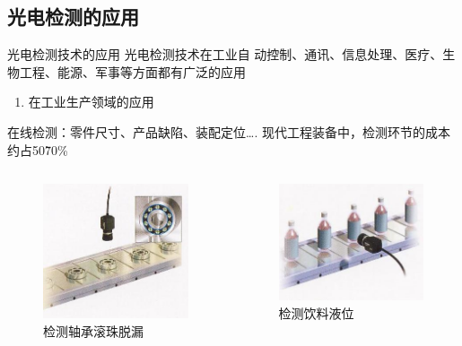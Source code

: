 \documentclass[10pt]{beamer}
\begin{document}
\subsection{光电检测的应用}
\begin{frame}{光电检测技术的应用}
光电检测技术在工业自
动控制、通讯、信息处理、医疗、生物工程、能源、军事等方面都有广泛的应用
    \begin{enumerate}
        \item 在工业生产领域的应用\\
     \end{enumerate}
        在线检测：零件尺寸、产品缺陷、装配定位….
现代工程装备中，检测环节的成本约占50\~ 70\%
    \begin{columns}
        \begin{column}{0.5\textwidth}
             \begin{figure}[htbp] 
            \centering\includegraphics[width=1.75in]{source/intro1.jpg} 
             \caption{检测轴承滚珠脱漏}\label{fig:2} 
             \end{figure}
        \end{column}
        \begin{column}{0.5\textwidth}
        \begin{figure}[htbp] 
            \centering\includegraphics[width=1.75in]{source/intro2.jpg} 
             \caption{检测饮料液位}\label{fig:3} 
            \end{figure}
        \end{column}
        \end{columns}
     
       
    
\end{frame}
\end{document}
